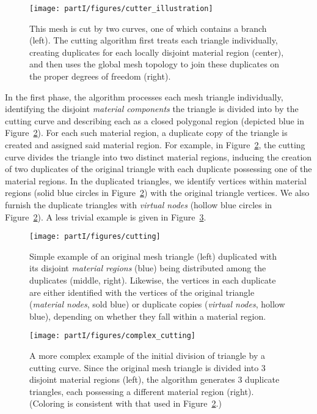 \setlength{\figurewidth}{\textwidth}
\begin{figure}[htb]
\centering
\texttt{[image: partI/figures/cutter\_illustration]}
\caption{This mesh is cut by two curves, one of which contains a branch (left). The cutting algorithm first treats each triangle individually, creating duplicates for each locally disjoint material region (center), and then uses the global mesh topology to join these duplicates on the proper degrees of freedom (right). }
\label{fig:partI.cutting.example}
\end{figure}

In the first phase, the algorithm processes each mesh triangle individually, identifying the disjoint \emph{material components} the triangle is divided into by the cutting curve and describing each as a closed polygonal region (depicted blue in Figure~\ref{fig:partI.cutting.triangle.2}). For each such material region, a duplicate copy of the triangle is created and assigned said material region. For example, in Figure~\ref{fig:partI.cutting.triangle.2}, the cutting curve divides the triangle into two distinct material regions, inducing the creation of two duplicates of the original triangle with each duplicate possessing one of the material regions. In the duplicated triangles, we identify vertices within material regions (solid blue circles in Figure~\ref{fig:partI.cutting.triangle.2}) with the original triangle vertices. We also furnish the duplicate triangles with \emph{virtual nodes} (hollow blue circles in Figure~\ref{fig:partI.cutting.triangle.2}). A less trivial example is given in Figure~\ref{fig:partI.cutting.triangle.3}.

\setlength{\figureheight}{0.25\textwidth}
\begin{figure}[htb]
\centering
\texttt{[image: partI/figures/cutting]}
\caption{Simple example of an original mesh triangle (left) duplicated with its disjoint \emph{material regions} (blue) being distributed among the duplicates (middle, right). Likewise, the vertices in each duplicate are either identified with the vertices of the original triangle (\emph{material nodes}, sold blue) or duplicate copies (\emph{virtual nodes}, hollow blue), depending on whether they fall within a material region.}
\label{fig:partI.cutting.triangle.2}
\end{figure}
\begin{figure}[htbp]
\centering
\texttt{[image: partI/figures/complex\_cutting]}
\caption{A more complex example of the initial division of triangle by a cutting curve. Since the original mesh triangle is divided into $3$ disjoint material regions (left), the algorithm generates $3$ duplicate triangles, each possessing a different material region (right). (Coloring is consistent with that used in Figure~\ref{fig:partI.cutting.triangle.2}.)}
\label{fig:partI.cutting.triangle.3}
\end{figure}

